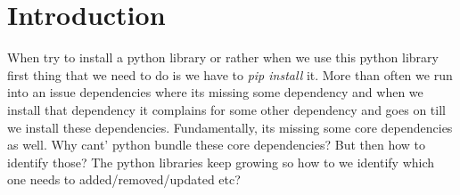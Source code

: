 \section{Introduction} \label{intro}
When try to install a python library or rather when we use this python 
library first thing that we need to do is we have to \textit{pip install} it.
More than often we run into an issue dependencies where its missing 
some dependency and when we install that dependency it complains 
for some other dependency and goes on till we install these dependencies.
Fundamentally, its missing some core dependencies as well. Why cant'
python bundle these core dependencies? But then how to identify those?
The python libraries keep growing so how to we identify which one needs
 to added/removed/updated etc? \newline 
  